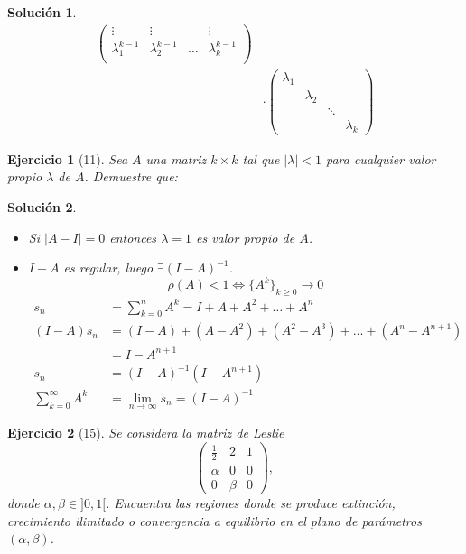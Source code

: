 \documentclass[11pt, a4paper]{article}
\newif\IfInSansMode
\numberwithin{equation}{section}
\theoremstyle{theorem-style}
\theoremstyle{definition-style}
\newtheorem{ejer}{Ejercicio}[section]
\theoremstyle{remark-style}
\newtheorem*{sol}{Solución}
\theoremstyle{example-style}
\begin{document}
\begin{sol}
\begin{align*}
\begin{pmatrix}
        \vdots & \vdots & & \vdots \\
        \lambda_1^{k-1} & \lambda_2^{k-1} & \hdots & \lambda_k^{k-1} \\
    \end{pmatrix} \\
        &\cdot \begin{pmatrix}
        \lambda_1 & & & \\
                  & \lambda_2 & & \\
                  & & \ddots & \\
                  & & & \lambda_k
    \end{pmatrix}
    \end{align*}
\end{sol}

\begin{ejer}[11]
    Sea $A$ una matriz $k \times k$ tal que $|\lambda| < 1$ para cualquier valor propio $\lambda$ de $A$. Demuestre que:
\end{ejer}

\begin{sol}\hfill\\
    \begin{itemize}
        \item Si $|A-I| = 0$ entonces $\lambda = 1$ es valor propio de $A$.
        \item $I-A$ es regular, luego $\exists (I-A)^{-1}$.
            $$\rho(A) < 1 \Leftrightarrow \{ A^{k}\}_{k \geq 0} \rightarrow 0$$
            \begin{align*}
                \label{}
                s_n &= \sum^{n}_{k=0} A^{k} = I + A + A^2 + \hdots + A^n \\
                (I - A)s_n &= (I-A) + (A-A^2) + (A^2-A^3) + \hdots + (A^n - A^{n+1}) \\
                           &= I - A^{n+1} \\
                s_n &= (I-A)^{-1}(I-A^{n+1}) \\
                \sum^{\infty}_{k=0} A^k &= \lim_{n \to \infty} s_n = (I -A)^{-1}
            \end{align*}
    \end{itemize}
\end{sol}

\begin{ejer}[15]
    Se considera la matriz de Leslie $$ \begin{pmatrix}
        \frac{1}{2} & 2 & 1 \\
        \alpha & 0 & 0 \\
        0 & \beta & 0
    \end{pmatrix},$$
    donde $\alpha, \beta \in ]0, 1[$. Encuentra las regiones donde se produce extinción, crecimiento ilimitado o convergencia a equilibrio en el plano de parámetros $(\alpha, \beta)$. 
\end{ejer}
\end{document}
